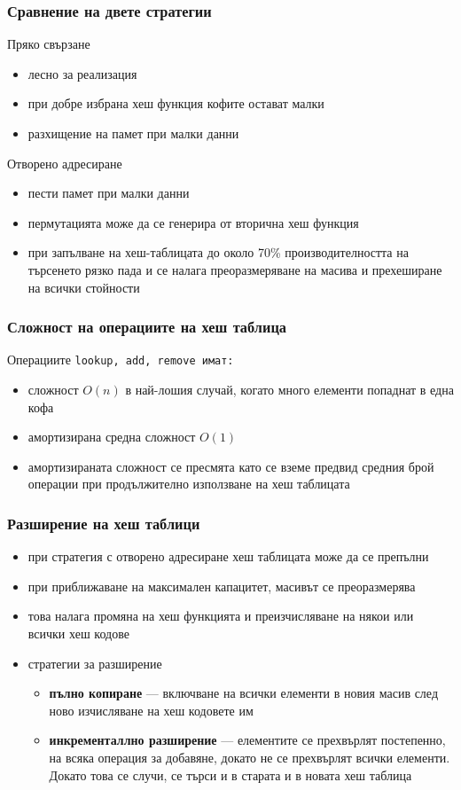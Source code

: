 \documentclass{beamer}
\begin{document}
\begin{frame}
  \frametitle{Сравнение на двете стратегии}
  Пряко свързане
  \begin{itemize}[<+->]
  \item лесно за реализация
  \item при добре избрана хеш функция кофите остават малки
  \item разхищение на памет при малки данни
  \end{itemize}
  \onslide<+->
  Отворено адресиране
  \begin{itemize}[<+->]
  \item пести памет при малки данни
  \item пермутацията може да се генерира от вторична хеш функция
  \item при запълване на хеш-таблицата до около 70\% производителността на търсенето рязко пада и се налага преоразмеряване на масива и прехеширане на всички стойности
  \end{itemize}
\end{frame}

\begin{frame}
  \frametitle{Сложност на операциите на хеш таблица}
  Операциите \tt{lookup}, \tt{add}, \tt{remove} имат:
  \begin{itemize}[<+->]
  \item сложност $O(n)$ в най-лошия случай, когато много елементи попаднат в една кофа
  \item \alert{амортизирана средна сложност $O(1)$}
  \item амортизираната сложност се пресмята като се вземе предвид средния брой операции при продължително използване на хеш таблицата
  \end{itemize}
\end{frame}

\begin{frame}
  \frametitle{Разширение на хеш таблици}
  \begin{itemize}[<+->]
  \item при стратегия с отворено адресиране хеш таблицата може да се препълни
  \item при приближаване на максимален капацитет, масивът се преоразмерява
  \item това налага промяна на хеш функцията и преизчисляване на някои или всички хеш кодове
  \item стратегии за разширение
    \begin{itemize}
    \item \textbf{пълно копиране} --- включване на всички елементи в новия масив след ново изчисляване на хеш кодовете им
    \item \textbf{инкременталлно разширение} --- елементите се прехвърлят постепенно, на всяка операция за добавяне, докато не се прехвърлят всички елементи. Докато това се случи, се търси и в старата и в новата хеш таблица
    \end{itemize}
  \end{itemize}
\end{frame}
\end{document}
